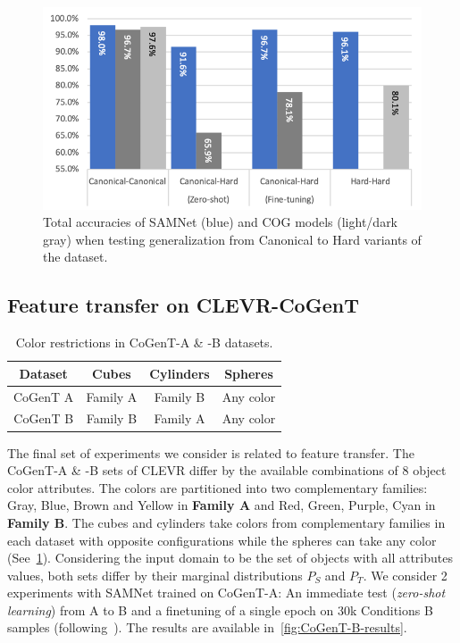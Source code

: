 \begin{figure}[htb]
	\centering
	\includegraphics[width=\columnwidth]{img/results/samnet_cog_overall_transfer.png}
	\caption{Total accuracies of SAMNet (blue) and COG models (light/dark gray) when testing generalization from Canonical to Hard variants of the dataset.}
	\label{fig:samnet_cog_overall_transfer}
\end{figure}


\subsection{Feature transfer on CLEVR-CoGenT}
\label{sec:feature}
\begin{table}[ht]
	\centering
		\begin{tabular}{cccc}
			\toprule
			Dataset	& Cubes	& Cylinders &	Spheres	\\
			\midrule
			CoGenT A &  Family A  & Family B 	&	Any color  \\
			CoGenT B	&	Family B  &	Family A	&	Any color \\
			\bottomrule
		\end{tabular}
	\caption{Color restrictions in CoGenT-A \& -B datasets.}
	\label{tab:cogent_conditions}
\end{table}

The final set of experiments we consider is related to feature transfer.
The CoGenT-A \& -B sets of CLEVR differ by the available combinations of 8 object color attributes.
The colors are partitioned into two complementary families: 
Gray, Blue, Brown and Yellow in \textbf{Family A} and Red, Green, Purple, Cyan in \textbf{Family B}. 
The cubes and cylinders take colors from complementary families in each dataset with opposite configurations while
the spheres can take any color (See~\cref{tab:cogent_conditions}). 
Considering the input domain to be the set of objects with all attributes values, both sets differ by their marginal distributions $P_S$ and $P_T$. We consider 2 experiments with SAMNet trained on CoGenT-A: An immediate test (\emph{zero-shot learning}) from A to B and a finetuning of a single epoch on 30k Conditions B samples (following~\cite{johnson2017inferring, mascharka2018transparency, perez2018film, marois2018transfer}). The results are available in~\cref{fig:CoGenT-B-results}.

